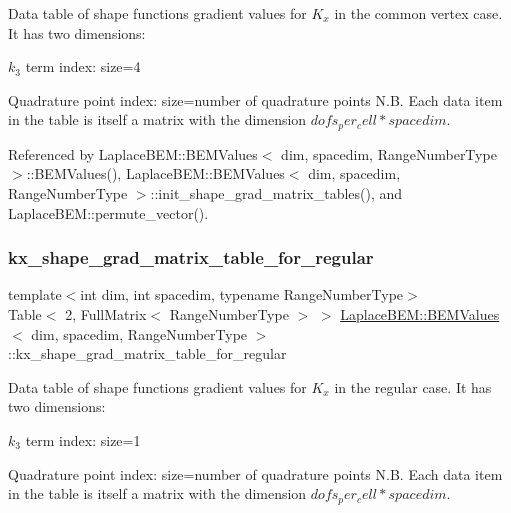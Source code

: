 Data table of shape function\textquotesingle{}s gradient values for $K_x$ in the common vertex case. It has two dimensions\+:
\begin{DoxyEnumerate}
\item $k_3$ term index\+: size=4
\item Quadrature point index\+: size=number of quadrature points N.\+B. Each data item in the table is itself a matrix with the dimension $dofs_per_cell*spacedim$. 
\end{DoxyEnumerate}

Referenced by Laplace\+B\+E\+M\+::\+B\+E\+M\+Values$<$ dim, spacedim, Range\+Number\+Type $>$\+::\+B\+E\+M\+Values(), Laplace\+B\+E\+M\+::\+B\+E\+M\+Values$<$ dim, spacedim, Range\+Number\+Type $>$\+::init\+\_\+shape\+\_\+grad\+\_\+matrix\+\_\+tables(), and Laplace\+B\+E\+M\+::permute\+\_\+vector().

\mbox{\label{classLaplaceBEM_1_1BEMValues_ab8c54d091a90e46854f782cb390fd176}} 
\subsubsection{\texorpdfstring{kx\+\_\+shape\+\_\+grad\+\_\+matrix\+\_\+table\+\_\+for\+\_\+regular}{kx\_shape\_grad\_matrix\_table\_for\_regular}}
{\footnotesize\ttfamily template$<$int dim, int spacedim, typename Range\+Number\+Type$>$ \\
Table$<$ 2, Full\+Matrix$<$ Range\+Number\+Type $>$ $>$ \hyperlink{classLaplaceBEM_1_1BEMValues}{Laplace\+B\+E\+M\+::\+B\+E\+M\+Values}$<$ dim, spacedim, Range\+Number\+Type $>$\+::kx\+\_\+shape\+\_\+grad\+\_\+matrix\+\_\+table\+\_\+for\+\_\+regular}

Data table of shape function\textquotesingle{}s gradient values for $K_x$ in the regular case. It has two dimensions\+:
\begin{DoxyEnumerate}
\item $k_3$ term index\+: size=1
\item Quadrature point index\+: size=number of quadrature points N.\+B. Each data item in the table is itself a matrix with the dimension $dofs_per_cell*spacedim$. 
\end{DoxyEnumerate}

